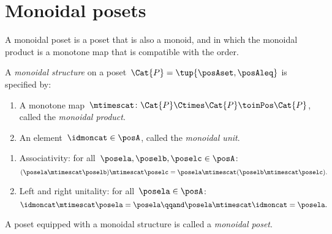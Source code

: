 
\section{Monoidal posets}
\label{sec:monoidal-posets}

A monoidal poset is a poset that is also a monoid, and in which the monoidal product is a monotone map that is compatible with the order.


\begin{ctdefinition}
	\label{def:monoidal-poset}
	A \emph{monoidal structure} on a poset~$\Cat{P} = \tup{\posAset, \posAleq}$ is specified by:

	\constit
	\begin{enumerate}
		\item A monotone map~$\mtimescat \colon \Cat{P} \Ctimes \Cat{P} \toinPos \Cat{P}$, called the \emph{monoidal product}.
		\item An element~$\idmoncat \in \posA$, called the \emph{monoidal unit}.
	\end{enumerate}

	\condit
	\begin{enumerate}
		\item Associativity: for all~$\posela, \poselb, \poselc \in \posA$:
		      \begin{equation}
			      (\posela \mtimescat \poselb)
			      \mtimescat \poselc =  \posela  \mtimescat ( \poselb \mtimescat \poselc).
		      \end{equation}
		\item Left and right unitality: for all~$\posela \in \posA$:
		      \begin{equation}
			      \idmoncat \mtimescat \posela = \posela
			      \qqand
			      \posela \mtimescat \idmoncat = \posela.
		      \end{equation}
	\end{enumerate}

	\noindent A poset equipped with a monoidal structure is called a \emph{monoidal poset}.
\end{ctdefinition}

